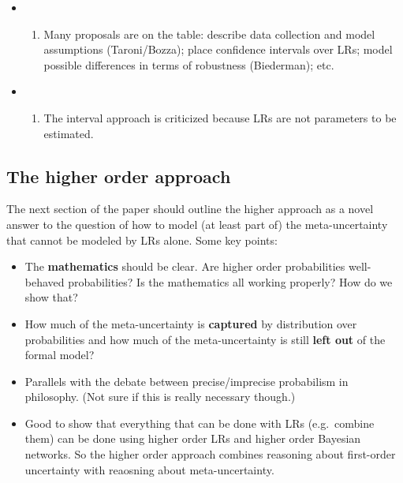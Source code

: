 \documentclass[
  10pt,
  dvipsnames,enabledeprecatedfontcommands]{scrartcl}
\providecommand{\tightlist}{%
  \setlength{\itemsep}{0pt}\setlength{\parskip}{0pt}}
\begin{document}
\begin{itemize}
\begin{enumerate}
  \end{enumerate}
\item
  \begin{enumerate}
  \def\labelenumi{(\roman{enumi})}
  \setcounter{enumi}{3}
  \tightlist
  \item
    Many proposals are on the table: describe data collection and model
    assumptions (Taroni/Bozza); place confidence intervals over LRs;
    model possible differences in terms of robustness (Biederman); etc.
  \end{enumerate}
\item
  \begin{enumerate}
  \def\labelenumi{(\alph{enumi})}
  \setcounter{enumi}{21}
  \tightlist
  \item
    The interval approach is criticized because LRs are not parameters
    to be estimated.
  \end{enumerate}
\end{itemize}

\hypertarget{the-higher-order-approach}{%
\subsection{The higher order approach}\label{the-higher-order-approach}}

The next section of the paper should outline the higher approach as a
novel answer to the question of how to model (at least part of) the
meta-uncertainty that cannot be modeled by LRs alone. Some key points:

\begin{itemize}
\item
  The \textbf{mathematics} should be clear. Are higher order
  probabilities well-behaved probabilities? Is the mathematics all
  working properly? How do we show that?
\item
  How much of the meta-uncertainty is \textbf{captured} by distribution
  over probabilities and how much of the meta-uncertainty is still
  \textbf{left out} of the formal model?
\item
  Parallels with the debate between precise/imprecise probabilism in
  philosophy. (Not sure if this is really necessary though.)
\item
  Good to show that everything that can be done with LRs (e.g.~combine
  them) can be done using higher order LRs and higher order Bayesian
  networks. So the higher order approach combines reasoning about
  first-order uncertainty with reaosning about meta-uncertainty.
\end{itemize}
\end{document}
